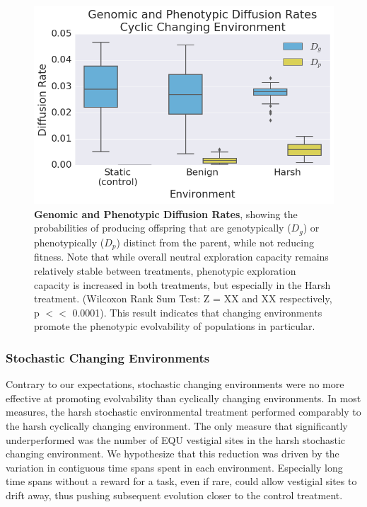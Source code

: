\documentclass[letterpaper]{article}
\begin{document}
\begin{figure}[h!] %
\begin{center}
\includegraphics[trim={0.2cm 0 0.4cm 0.25cm},clip,width=1\columnwidth]{figures/CCE_D_g_D_p__box.png}
\caption{\textbf{Genomic and Phenotypic Diffusion Rates}, showing the probabilities of producing offspring that are genotypically ($D_g$) or phenotypically ($D_p$) distinct from the parent, while 
not reducing fitness.
Note that while overall neutral exploration capacity remains relatively stable between treatments, phenotypic exploration capacity is increased in both treatments, but especially in the Harsh treatment. (Wilcoxon Rank Sum Test: Z = XX and XX respectively, p $<<$ 0.0001). This result indicates that changing environments promote the phenotypic evolvability of populations in particular.
}\label{fig:CCE_diffusion_rate}
\end{center}
\end{figure}
\subsubsection{Stochastic Changing Environments}

Contrary to our expectations, stochastic changing environments were no more effective at promoting evolvability than cyclically changing environments. In most measures, the harsh stochastic environmental treatment performed comparably to the harsh cyclically changing environment. 
The only measure that significantly underperformed was the number of EQU vestigial sites in the harsh stochastic changing environment. We hypothesize that this reduction was driven by the variation in contiguous time spans spent in each environment. Especially long time spans without a reward for a task, even if rare, could allow vestigial sites to drift away, thus pushing subsequent evolution closer to the control treatment. 
\end{document}
